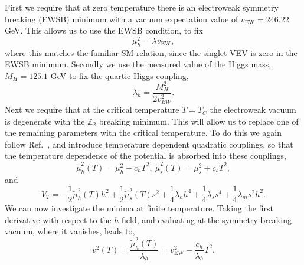 \documentclass[final,3p,11pt,pdflatex]{elsarticle}
\renewcommand{\refeq}[1]{Eq.~\ref{#1}}
\newcommand{\refcite}[1]{Ref.~\cite{#1}}
\begin{document}
First we require that at zero temperature there is an electroweak
symmetry breaking (EWSB) minimum with a vacuum expectation value of
$v_\text{EW} = 246.22$ GeV.  This allows us to use the EWSB condition,
to fix
\begin{equation}
\label{Eq:mu_h_Zero_T}
  \mu_h^2 = \lambda  v_\text{EW},
\end{equation}
where this matches the familiar SM relation, since the
singlet VEV is zero in the EWSB minimum. Secondly we use
the measured value of the Higgs mass, $M_H =125.1$ GeV
\cite{Khachatryan:2016vau} to fix the
quartic Higgs coupling,
\begin{equation}
\label{eq:lambda_h}
\lambda_h = \frac{M_H^2}{2 v^2_{EW}}.
\end{equation}
Next we require that at the critical temperature $T=T_C$ the
electroweak vacuum is degenerate with the $\mathbb{Z}_2$ breaking
minimum.  This will allow us to replace one of the remaining
parameters with the critical temperature. To do this we again follow
\refcite{EspinosaStrongElectroweakPhase2012}, and introduce
temperature dependent quadratic couplings, so that the temperature
dependence of the potential is absorbed into these couplings,
%
\begin{equation}
\tilde{\mu}_h^2(T) = \mu_h^2 - c_h T^2,\ \tilde{\mu}_s^2(T) = \mu_s^2 + c_s T^2,
\end{equation}
%
and
%
\begin{equation}
V_T = -\frac{1}{2} \tilde{\mu}_h^2(T) h^2 + \frac{1}{2} \tilde{\mu}_s^2(T) s^2 + \frac{1}{4} \lambda_h h^4 + \frac{1}{4} \lambda_s s^4 + \frac{1}{4} \lambda_m s^2 h^2.
\end{equation}
We can now investigate the minima at finite temperature. Taking the first derivative with respect to the $h$ field,
%
and evaluating at the symmetry breaking vacuum, where it vanishes, leads to,
%
\begin{equation}
\label{eq:higgs_ewsb}
v^2(T) = \frac{\tilde{\mu}_h^2(T)}{\lambda_h} = v^2_\text{EW} - \frac{c_h}{\lambda_h} T^2.
\end{equation}
\end{document}

